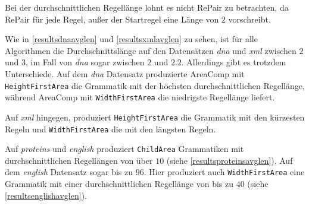Bei der durchschnittlichen Regellänge lohnt es nicht RePair zu betrachten, da RePair für jede Regel, außer der Startregel eine Länge von $2$ vorschreibt.

Wie in \autoref{resultsdnaavglen} und \autoref{resultsxmlavglen} zu sehen, ist für alle Algorithmen die Durchschnittslänge auf den Datensätzen \emph{dna} und \emph{xml} zwischen $2$ und $3$, im Fall von \emph{dna} sogar zwischen $2$ und $2.2$. Allerdings gibt es trotzdem Unterschiede. Auf dem \emph{dna} Datensatz produzierte AreaComp mit \texttt{HeightFirstArea} die Grammatik mit der höchsten durchschnittlichen Regellänge, während AreaComp mit \texttt{WidthFirstArea} die niedrigste Regellänge liefert.

Auf \emph{xml} hingegen, produziert \texttt{HeightFirstArea} die Grammatik mit den kürzesten Regeln und \texttt{WidthFirstArea} die mit den längsten Regeln.

Auf \emph{proteins} und \emph{english} produziert \texttt{ChildArea} Grammatiken mit durchschnittlichen Regellängen von über $10$ (siehe \autoref{resultsproteinsavglen}). Auf dem \emph{english} Datensatz sogar bis zu $96$.
Hier produziert auch \texttt{WidthFirstArea} eine Grammatik mit einer durchschnittlichen Regellänge von bis zu $40$ (siehe \autoref{resultsenglishavglen}).



